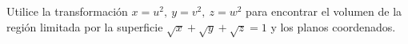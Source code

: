 \item Utilice la transformación $x = u^2, \ y = v^2, \ z = w^2$ para encontrar el volumen de la región limitada por la superficie $\sqrt{x} + \sqrt{y} + \sqrt{z} = 1$ y los planos coordenados.
